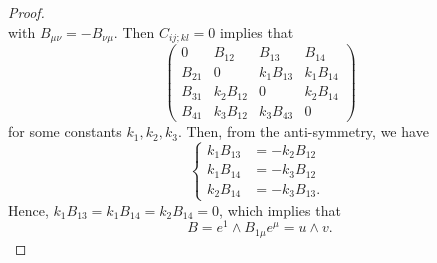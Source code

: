 \documentclass{article}
\begin{document}
\begin{proof}
\begin{equation}
\end{equation}
with $B_{\mu \nu} = -B_{\nu \mu}$. Then $C_{ij;kl} = 0$ implies that
\begin{equation}
\label{}
\left(\begin{array}{cccc}0 & B_{12} & B_{13} & B_{14} \\B_{21} & 0 & k_1B_{13} & k_1B_{14} \\B_{31} & k_2B_{12} & 0 & k_2B_{14} \\B_{41} & k_3B_{12} & k_3B_{43} & 0\end{array}\right)
\end{equation}
for some constants $k_1,k_2,k_3$. Then, from the anti-symmetry, we have
\begin{equation}
\label{ }
\begin{cases}
    k_1B_{13}  &= -k_2B_{12} \text{ } \\
    k_1B_{14}  &= -k_3B_{12} \text{} \\
    k_2B_{14}  &= -k_3B_{13}.
\end{cases}
\end{equation}
Hence, $k_1B_{13}=k_1B_{14}=k_2B_{14}=0$, which implies that
\begin{equation}
\label{}
B = e^1 \wedge B_{1\mu} e^{\mu} = u\wedge v.
\end{equation}
\end{proof}
\end{document}
